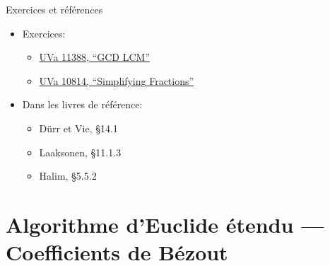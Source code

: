 \documentclass{main}
\begin{document}
\begin{frame}{Exercices et références}
    \begin{itemize}
        \item Exercices:
        \begin{itemize}
            \item \href{https://vjudge.net/problem/UVA-11388}{UVa 11388, “GCD LCM”}
            \item \href{https://vjudge.net/problem/UVA-10814}{UVa 10814, “Simplifying Fractions”}
        \end{itemize}
        \item Dans les livres de référence:
        \begin{itemize}
            \item Dürr et Vie, §14.1
            \item Laaksonen, §11.1.3
            \item Halim, §5.5.2
        \end{itemize}
    \end{itemize}
\end{frame}

\section{Algorithme d’Euclide étendu --- Coefficients de Bézout}
\maketoc
\end{document}
